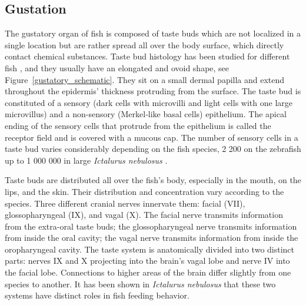     \subsection{Gustation}
    The gustatory organ of fish is composed of taste buds which are not localized in a single location but are rather spread all over the body surface, which directly contact chemical substances. Taste bud histology has been studied for different fish \cite{kapoor1976gustatory,fishelson2004taste,reutter2000heterogeneity,reutter1991ultrastructure,reutter2012taste}, and they usually have an elongated and ovoid shape, see Figure~\ref{gustatory_schematic}. They sit on a small dermal papilla and extend throughout the epidermis' thickness protruding from the surface. The taste bud is constituted of a sensory (dark cells with microvilli and light cells with one large microvillus) and a non-sensory (Merkel‐like basal cells) epithelium. The apical ending of the sensory cells that protrude from the epithelium is called the receptor field and is covered with a mucous cap. The number of sensory cells in a taste bud varies considerably depending on the fish species, 2 200 on the zebrafish up to 1 000 000 in large \textit{Ictalurus nebulosus} \cite{kasumyan2019taste}.

    Taste buds are distributed all over the fish's body, especially in the mouth, on the lips, and the skin. Their distribution and concentration vary according to the species. Three different cranial nerves innervate them: facial (VII), glossopharyngeal (IX), and vagal (X). The facial nerve transmits information from the extra-oral taste buds; the glossopharyngeal nerve transmits information from inside the oral cavity; the vagal nerve transmits information from inside the oropharyngeal cavity. The taste system is anatomically divided into two distinct parts: nerves IX and X projecting into the brain's vagal lobe and nerve IV into the facial lobe. Connections to higher areas of the brain differ slightly from one species to another. It has been shown in \textit{Ictalurus nebulosus} \cite{atema1971structures} that these two systems have distinct roles in fish feeding behavior.


